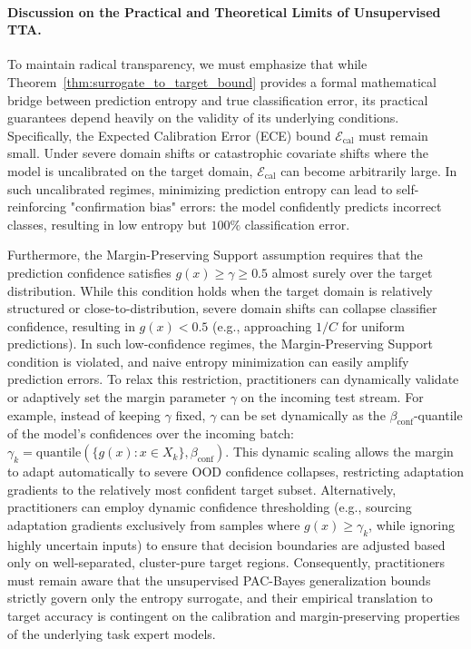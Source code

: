 \paragraph{Discussion on the Practical and Theoretical Limits of Unsupervised TTA.}
To maintain radical transparency, we must emphasize that while
Theorem~\ref{thm:surrogate_to_target_bound} provides a formal mathematical
bridge between prediction entropy and true classification error, its practical
guarantees depend heavily on the validity of its underlying conditions.
Specifically, the Expected Calibration Error (ECE) bound
$\mathcal{E}_{\text{cal}}$ must remain small. Under severe domain shifts or
catastrophic covariate shifts where the model is uncalibrated on the target
domain, $\mathcal{E}_{\text{cal}}$ can become arbitrarily large. In such
uncalibrated regimes, minimizing prediction entropy can lead to self-reinforcing
"confirmation bias" errors: the model confidently predicts incorrect classes,
resulting in low entropy but $100\%$ classification error.

Furthermore, the Margin-Preserving Support assumption requires that the prediction confidence satisfies $g(x) \ge \gamma \ge 0.5$ almost surely over the target distribution. While this condition holds when the target domain is relatively structured or close-to-distribution, severe domain shifts can collapse classifier confidence, resulting in $g(x) < 0.5$ (e.g., approaching $1/C$ for uniform predictions). In such low-confidence regimes, the Margin-Preserving Support condition is violated, and naive entropy minimization can easily amplify prediction errors. To relax this restriction, practitioners can dynamically validate or adaptively set the margin parameter $\gamma$ on the incoming test stream. For example, instead of keeping $\gamma$ fixed, $\gamma$ can be set dynamically as the $\beta_{\text{conf}}$-quantile of the model's confidences over the incoming batch: $\gamma_k = \text{quantile}(\{g(x) : x \in X_k\}, \beta_{\text{conf}})$. This dynamic scaling allows the margin to adapt automatically to severe OOD confidence collapses, restricting adaptation gradients to the relatively most confident target subset. Alternatively, practitioners can employ dynamic confidence thresholding (e.g., sourcing adaptation gradients exclusively from samples where $g(x) \ge \gamma_k$, while ignoring highly uncertain inputs) to ensure that decision boundaries are adjusted based only on well-separated, cluster-pure target regions. Consequently, practitioners must remain aware that the unsupervised PAC-Bayes generalization bounds strictly govern only the entropy surrogate, and their empirical translation to target accuracy is contingent on the calibration and margin-preserving properties of the underlying task expert models.

